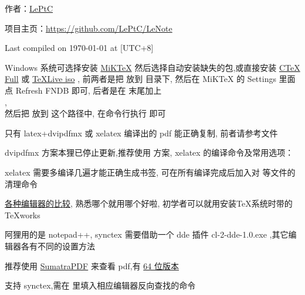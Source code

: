 \documentclass{leptc}
\begin{document}

作者：\href{mailto:alileptc@gmail.com}{LePtC}

项目主页：\url{https://github.com/LePtC/LeNote }

Last compiled on {\yyyymmdddate\today} at {\hhmmsstime} [UTC+8]



Windows 系统可选择安装 
\href{http://miktex.org/download}{MiKTeX}
然后选择自动安装缺失的包,或直接安装 
\href{http://www.ctex.org/CTeXDownload }{CTeX Full} 
或 \href{http://www.ctan.org/tex-archive/systems/texlive/Images/ }{TeXLive iso} ,
前两者是把  放到 
 目录下,
然后在 MiKTeX 的 Settings 里面点 Refresh FNDB 即可,
后者是在  末尾加上 
\\ , 
\\然后把 放到 
 这个路径中,
在命令行执行  即可

只有 latex+dvipdfmx 或 xelatex 编译出的 pdf 能正确复制,
前者请参考文件 

dvipdfmx 方案本狸已停止更新,推荐使用 \XeTeX 方案, 
xelatex 的编译命令及常用选项：


xelatex 需要多编译几遍才能正确生成书签,
可在所有编译完成后加入对
等文件的清理命令


\href{http://tex.stackexchange.com/questions/339/latex-editors-ides }{各种编辑器的比较},
熟悉哪个就用哪个好啦,
初学者可以就用安装\TeX 系统时带的 TeXworks 

阿狸用的是 notepad++, synctex 需要借助一个 dde 插件 
cl-2-dde-1.0.exe ,其它编辑器各有不同的设置方法

 推荐使用 
\href{http://blog.kowalczyk.info/software/sumatrapdf/download-free-pdf-viewer-cn.html }{SumatraPDF} 
来查看 pdf,有 
\href{http://xhmikosr.1f0.de/sumatrapdf/ }{64 位版本}

支持 synctex,需在  里填入相应编辑器反向查找的命令
\end{document}
